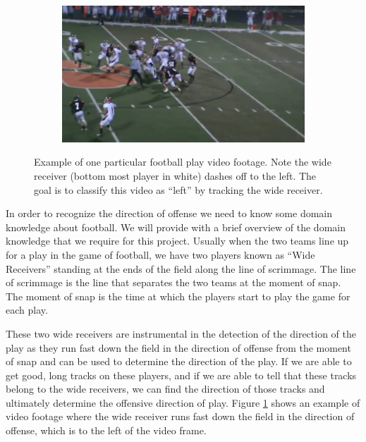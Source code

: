 \documentclass{article} %
\begin{document}
{\begin{figure}
\begin{subfigure}{.24\textwidth}
 \end{subfigure}\hspace{.5em}%
 \begin{subfigure}{.24\textwidth}
  \centering
  \includegraphics[width=1\linewidth]{img/football_frame4.jpg}
 \end{subfigure}
\caption{Example of one particular football play video footage. Note the wide receiver (bottom most player in white) dashes off to the left. The goal is to classify this video as ``left'' by tracking the wide receiver.}
\label{fig:football}
\end{figure}
}

In order to recognize the direction of offense we need to know some domain knowledge about football. We will provide with a brief overview of the domain knowledge that we require for this project. Usually when the two teams line up for a play in the game of football, we have two players known as ``Wide Receivers'' standing at the ends of the field along the line of scrimmage. The line of scrimmage is the line that separates the two teams at the moment of snap. The moment of snap is the time at which the players start to play the game for each play. 

These two wide receivers are instrumental in the detection of the direction of the play as they run fast down the field in the direction of offense from the moment of snap and can be used to determine the direction of the play. If we are able to get good, long tracks on these players, and if we are able to tell that these tracks belong to the wide receivers, we can find the direction of those tracks and ultimately determine the offensive direction of play. Figure \ref{fig:football} shows an example of video footage where the wide receiver runs fast down the field in the direction of offense, which is to the left of the video frame.
\end{document}

